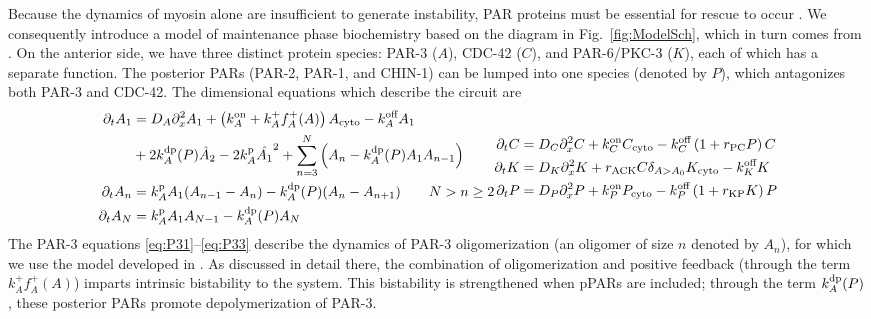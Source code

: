 \documentclass[11pt]{article}
\newcommand{\6}[1]{#1_{\text{6}}}
\newcommand{\3}[1]{#1_{\text{3}}}
\begin{document}
Because the dynamics of myosin alone are insufficient to generate instability, PAR proteins must be essential for rescue to occur \cite{zonies2010symmetry}. We consequently introduce a model of maintenance phase biochemistry based on the diagram in Fig.\ \ref{fig:ModelSch}, which in turn comes from \cite[Fig.~2]{lang2017proteins}. On the anterior side, we have three distinct protein species: PAR-3 ($A$), CDC-42 ($C$), and PAR-6/PKC-3 ($K$), each of which has a separate function. The posterior PARs (PAR-2, PAR-1, and CHIN-1) can be lumped into one species (denoted by $P$), which antagonizes both PAR-3 and CDC-42. The dimensional equations which describe the circuit are 
\begin{subequations}
\label{eq:AllBC}
\begin{align}
\label{eq:P31}
\Dt \MA & = D_A \Dx^2 \MA + \left(\kon_A+k^+_A f^+_A(A) \right)A_\text{cyto}- \koff_A \MA  \\  \nonumber
 &+ 2 \kdp_A(P) \hat{A}_2-2\kp_A \hat{\MA}^2+\sum_{n=3}^N \left(A_n-\kdp_A(P) A_1 A_{n-1}\right)  \\ 
\Dt \PA & =\kp_{A}\MA (A_{n-1}-A_n) -\kdp_A(P)(A_n-A_{n+1})  \qquad N > n \geq 2 \\ 
\label{eq:P33}
\Dt A_N & =\kp_A \MA  A_{N-1}-\kdp_A(P) A_N 
\end{align}
\begin{align}
\label{eq:Ceqn}
\Dt C& =D_C \Dx^2 {C} +\kon_C C_\text{cyto}  - \koff_C \left(1+r_\text{PC}P\right)C\\
\label{eq:Keqn}
\Dt {K}  &= D_K \Dx^2 {K} + {r}_\text{ACK} {C} \delta_{A > A_0}K_\text{cyto}-\koff_K K \\
\Dt {P} & =D_P \Dx^2 {P} +\kon_P P_\text{cyto}  - \koff_P \left(1+{r}_\text{KP}{K}\right){P}
\end{align}
\end{subequations}
The PAR-3 equations \eqref{eq:P31}--\eqref{eq:P33} describe the dynamics of PAR-3 oligomerization  (an oligomer of size $n$ denoted by $A_n$), for which we use the model developed in \cite{lang2023oligomerization}. As discussed in detail there, the combination of oligomerization and positive feedback (through the term $k^+_A f^+_A(A)$) imparts intrinsic bistability to the system. This bistability is strengthened when pPARs are included; through the term $k^\text{dp}_A(P)$, these posterior PARs promote depolymerization of PAR-3.
\end{document}
